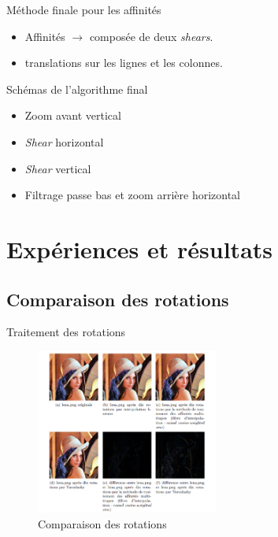 \documentclass[c,12pt]{beamer}
\newcommand{\ra}[0]{\rightarrow}
\begin{document}
\begin{frame}{Méthode finale pour les affinités}
\begin{itemize}
\item Affinités $\ra$ composée de deux \emph{shears}.
\item translations sur les lignes et les colonnes.
\end{itemize}

\begin{block}{Schémas de l'algorithme final}

\begin{itemize}
\item Zoom avant vertical
\item \emph{Shear} horizontal
\item \emph{Shear} vertical
\item Filtrage passe bas et zoom arrière horizontal
\end{itemize}

\end{block}

\end{frame}
    
    
    
     
\section{Expériences et résultats}


\subsection{Comparaison des rotations}

\begin{frame}{Traitement des rotations}
\begin{figure}
\centering
\includegraphics[width=6cm]{rotation_all.png}
\caption{Comparaison des rotations}
\end{figure}
\end{frame}
\end{document}
